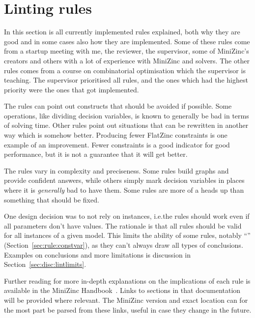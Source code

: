 \documentclass[a4paper,12pt]{article}
\newcommand{\ruleref}[1]{``\nameref{sec:rule:#1}'' (Section~\ref{sec:rule:#1})}
\begin{document}
\section{Linting rules}\label{sec:rules}
In this section is all currently implemented rules explained, both why they are good
and in some cases also how they are implemented. Some of these rules come from a
startup meeting with me, the reviewer, the supervisor, some of MiniZinc's creators and others
with a lot of experience with MiniZinc and solvers. The other rules comes from a course on
combinatorial optimisation which the supervisor is teaching.
The supervisor prioritised all rules, and the ones which had the highest priority were the
ones that got implemented.

The rules can point out constructs that should be avoided if possible. Some operations,
like dividing decision variables, is known to generally be bad in terms of solving time.
Other rules point out situations that can be rewritten in another way which is somehow
better. Producing fewer FlatZinc constraints is one example of an improvement. Fewer
constraints is a good indicator for good performance, but it is not a guarantee
that it will get better.

The rules vary in complexity and preciseness. Some rules build graphs and provide
confident answers, while others simply mark decision variables in places where it is
\emph{generally} bad to have them. Some rules are more of a heads up than something that
should be fixed.

One design decision was to not rely on instances, i.e.\@ the rules should work even if all
parameters don't have values. The rationale is that all rules should be valid for all
instances of a given model. This limits the ability of some rules, notably
\ruleref{constvar}, as they can't always draw all types of conclusions. Examples on
conclusions and more limitations is discussion in Section~\ref{sec:disc:lintlimits}.

Further reading for more in-depth explanations on the implications of each rule is
available in the MiniZinc Handbook~\cite{mznbook}. Links to sections in that documentation
will be provided where relevant. The MiniZinc version and exact location can for the most
part be parsed from these links, useful in case they change in the future.
\end{document}
